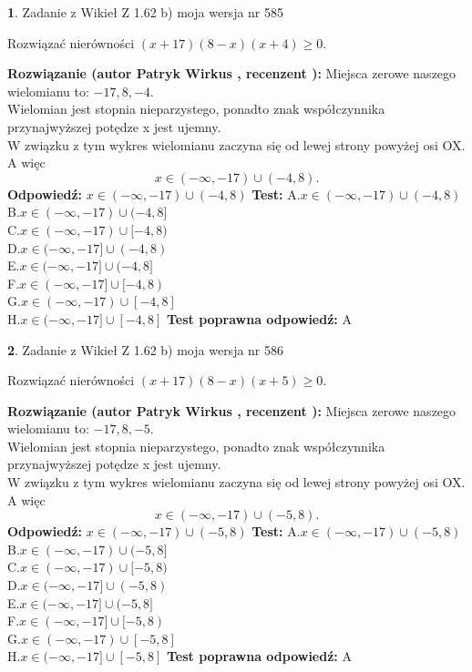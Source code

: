 \documentclass[12pt, a4paper]{article}
\theoremstyle{definition} %
\newtheorem{zad}{}
\newcommand{\zadStart}[1]{\begin{zad}#1\newline}
\newcommand{\zadStop}{\end{zad}}
\newcommand{\rozwStart}[2]{\noindent \textbf{Rozwiązanie (autor #1 , recenzent #2): }\newline}
\newcommand{\rozwStop}{\newline}
\newcommand{\odpStart}{\noindent \textbf{Odpowiedź:}\newline}
\newcommand{\odpStop}{\newline}
\newcommand{\testStart}{\noindent \textbf{Test:}\newline}
\newcommand{\testStop}{\newline}
\newcommand{\kluczStart}{\noindent \textbf{Test poprawna odpowiedź:}\newline}
\newcommand{\kluczStop}{\newline}
\begin{document}
\zadStart{Zadanie z Wikieł Z 1.62 b) moja wersja nr 585}

Rozwiązać nierówności $(x+17)(8-x)(x+4)\ge0$.
\zadStop
\rozwStart{Patryk Wirkus}{}
Miejsca zerowe naszego wielomianu to: $-17, 8, -4$.\\
Wielomian jest stopnia nieparzystego, ponadto znak współczynnika przy\linebreak najwyższej potędze x jest ujemny.\\ W związku z tym wykres wielomianu zaczyna się od lewej strony powyżej osi OX. A więc $$x \in (-\infty,-17) \cup (-4,8).$$
\rozwStop
\odpStart
$x \in (-\infty,-17) \cup (-4,8)$
\odpStop
\testStart
A.$x \in (-\infty,-17) \cup (-4,8)$\\
B.$x \in (-\infty,-17) \cup (-4,8]$\\
C.$x \in (-\infty,-17) \cup [-4,8)$\\
D.$x \in (-\infty,-17] \cup (-4,8)$\\
E.$x \in (-\infty,-17] \cup (-4,8]$\\
F.$x \in (-\infty,-17] \cup [-4,8)$\\
G.$x \in (-\infty,-17) \cup [-4,8]$\\
H.$x \in (-\infty,-17] \cup [-4,8]$
\testStop
\kluczStart
A
\kluczStop



\zadStart{Zadanie z Wikieł Z 1.62 b) moja wersja nr 586}

Rozwiązać nierówności $(x+17)(8-x)(x+5)\ge0$.
\zadStop
\rozwStart{Patryk Wirkus}{}
Miejsca zerowe naszego wielomianu to: $-17, 8, -5$.\\
Wielomian jest stopnia nieparzystego, ponadto znak współczynnika przy\linebreak najwyższej potędze x jest ujemny.\\ W związku z tym wykres wielomianu zaczyna się od lewej strony powyżej osi OX. A więc $$x \in (-\infty,-17) \cup (-5,8).$$
\rozwStop
\odpStart
$x \in (-\infty,-17) \cup (-5,8)$
\odpStop
\testStart
A.$x \in (-\infty,-17) \cup (-5,8)$\\
B.$x \in (-\infty,-17) \cup (-5,8]$\\
C.$x \in (-\infty,-17) \cup [-5,8)$\\
D.$x \in (-\infty,-17] \cup (-5,8)$\\
E.$x \in (-\infty,-17] \cup (-5,8]$\\
F.$x \in (-\infty,-17] \cup [-5,8)$\\
G.$x \in (-\infty,-17) \cup [-5,8]$\\
H.$x \in (-\infty,-17] \cup [-5,8]$
\testStop
\kluczStart
A
\kluczStop
\end{document}
